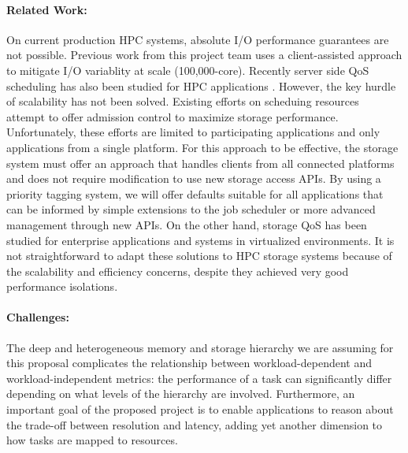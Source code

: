 \paragraph{Related Work:} On current production HPC systems, absolute I/O performance
guarantees are not possible. Previous work \cite{lofstead:2010:io-variability,liu_hotstorage} 
from this project team uses a client-assisted approach to mitigate I/O variablity at scale (100,000-core).
Recently server side QoS scheduling has also been studied for HPC applications \cite{Dai:2014}.
However, the key hurdle of scalability has not been solved.
Existing efforts on scheduing resources~\cite{thapaliya:2014:io-cop,dorier:2014:calciom} attempt to offer
admission control to maximize storage performance. Unfortunately, these efforts
are limited to participating applications and only applications from a single
platform. For this approach to be effective, the storage system must offer an
approach that handles clients from all connected platforms and does not
require modification to use new storage access APIs. By using a priority
tagging system, we will offer defaults suitable for all applications that can
be informed by simple extensions to the job scheduler or more advanced
management through new APIs. On the other hand, storage QoS has been
studied for enterprise applications and systems \cite {Gulati:2007,Gulati:2010,Gulati:2012}
in virtualized environments. It is not straightforward to adapt these solutions
to HPC storage systems because of the scalability and efficiency concerns, despite
they achieved very good performance isolations.

\paragraph{Challenges:} The deep and heterogeneous memory and storage
hierarchy we are assuming for this proposal complicates the
relationship between workload-dependent and workload-independent
metrics: the performance of a task can significantly differ depending
on what levels of the hierarchy are involved. Furthermore, an
important goal of the proposed project is to enable applications
to reason about the trade-off between resolution and latency, adding
yet another dimension to how tasks are mapped to resources.

